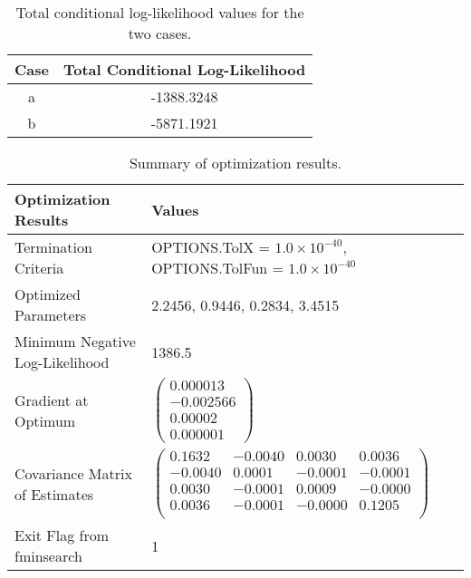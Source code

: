 \documentclass[12pt]{article}
\begin{document}
\begin{table}[h!]
\centering
\begin{tabular}{|c|c|}
\hline
\textbf{Case} & \textbf{Total Conditional Log-Likelihood} \\ \hline
a             & -1388.3248                                \\ \hline
b             & -5871.1921                                \\ \hline
\end{tabular}
\caption{Total conditional log-likelihood values for the two cases.}
\label{tab:log_likelihood_results}
\end{table}


\begin{table}[h!]
\centering
\begin{tabular}{|l|l|}
\hline
\textbf{Optimization Results}              & \textbf{Values}                                                                 \\ \hline
Termination Criteria                       & OPTIONS.TolX = $1.0 \times 10^{-40}$, OPTIONS.TolFun = $1.0 \times 10^{-40}$     \\ \hline
Optimized Parameters                       & 2.2456, 0.9446, 0.2834, 3.4515                                                  \\ \hline
Minimum Negative Log-Likelihood            & 1386.5                                                                          \\ \hline
Gradient at Optimum                        & $\begin{pmatrix}
0.000013 \\
-0.002566 \\
0.00002 \\
0.000001
\end{pmatrix}$                                                                  \\ \hline
Covariance Matrix of Estimates             & $\begin{pmatrix}
0.1632 & -0.0040 & 0.0030 & 0.0036 \\
-0.0040 & 0.0001 & -0.0001 & -0.0001 \\
0.0030 & -0.0001 & 0.0009 & -0.0000 \\
0.0036 & -0.0001 & -0.0000 & 0.1205 \\
\end{pmatrix}$                                                                \\ \hline
Exit Flag from fminsearch                  & 1                                                                              \\ \hline
\end{tabular}
\caption{Summary of optimization results.}
\label{tab:optimization_results}
\end{table}
\end{document}
